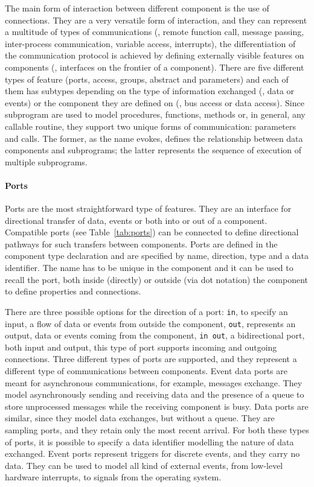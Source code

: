 The main form of interaction between different component is the use of connections. They are a very versatile form of interaction, and they can represent a multitude of types of communications (\eg, remote function call, message passing, inter-process communication, variable access, interrupts), the differentiation of the communication protocol is achieved by defining externally visible features on components (\ie, interfaces on the frontier of a component). There are five different types of feature (ports, access, groups, abstract and parameters) and each of them has subtypes depending on the type of information exchanged (\eg, data or events) or the component they are defined on (\eg, bus access or data access). Since subprogram are used to model procedures, functions, methods or, in general, any callable routine, they support two unique forms of communication: parameters and calls. The former, as the name evokes, defines the relationship between data components and subprograms; the latter represents the sequence of execution of multiple subprograms.

\paragraph{Ports}
Ports are the most straightforward type of features. They are an interface for directional transfer of data, events or both into or out of a component. Compatible ports (see Table~\ref{tab:ports}) can be connected to define directional pathways for such transfers between components. Ports are defined in the component type declaration and are specified by name, direction, type and a data identifier. The name has to be unique in the component and it can be used to recall the port, both inside (directly) or outside (via dot notation) the component to define properties and connections.

There are three possible options for the direction of a port: \texttt{in}, to specify an input, a flow of data or events from outside the component, \texttt{out}, represents an output, data or events coming from the component, \texttt{in out}, a bidirectional port, both input and output, this type of port supports incoming and outgoing connections. Three different types of ports are supported, and they represent a different type of communications between components. Event data ports are meant for asynchronous communications, for example, messages exchange. They model asynchronously sending and receiving data and the presence of a queue to store unprocessed messages while the receiving component is busy. Data ports are similar, since they model data exchanges, but without a queue. They are sampling ports, and they retain only the most recent arrival. For both these types of ports, it is possible to specify a data identifier modelling the nature of data exchanged. Event ports represent triggers for discrete events, and they carry no data. They can be used to model all kind of external events, from low-level hardware interrupts, to signals from the operating system.

